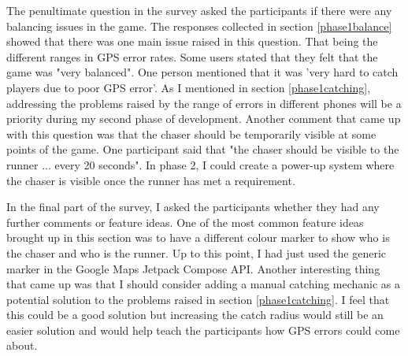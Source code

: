 \documentclass{l4proj}
\begin{document}
The penultimate question in the survey asked the participants if there were any balancing issues in the game. The responses collected
in section \ref{phase1balance} showed that there was one main issue raised in this question. That being the different ranges in GPS error rates.
Some users stated that they felt that the game was "very balanced". One person mentioned that it was 'very hard to catch players due to poor GPS error'.
As I mentioned in section \ref{phase1catching}, addressing the problems raised by the range of errors in different phones will be a priority
during my second phase of development. Another comment that came up with this question was that the chaser should be temporarily visible at some
points of the game. One participant said that "the chaser should be visible to the runner ... every 20 seconds". In phase 2, I could create
a power-up system where the chaser is visible once the runner has met a requirement.

In the final part of the survey, I asked the participants whether they had any further comments or feature ideas. One of the most common
feature ideas brought up in this section was to have a different colour marker to show who is the chaser and who is the runner. Up to this
point, I had just used the generic marker in the Google Maps Jetpack Compose API. Another interesting thing that came up was that I should consider
adding a manual catching mechanic as a potential solution to the problems raised in section \ref{phase1catching}. I feel that this could be
a good solution but increasing the catch radius would still be an easier solution and would help teach the participants how GPS errors could
come about.
\end{document}
